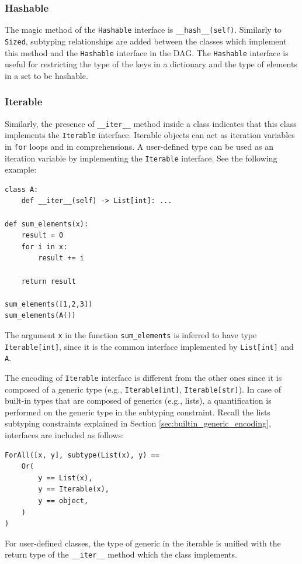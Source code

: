 \subsubsection{Hashable}
The magic method of the \lstinline|Hashable| interface is \lstinline|__hash__(self)|. Similarly to \lstinline|Sized|, subtyping relationships are added between the classes which implement this method and the \lstinline|Hashable| interface in the DAG. The \lstinline|Hashable| interface is useful for restricting the type of the keys in a dictionary and the type of elements in a set to be hashable.

\subsubsection{Iterable}
Similarly, the presence of \lstinline|__iter__| method inside a class indicates that this class implements the \lstinline|Iterable| interface. Iterable objects can act as iteration variables in \lstinline|for| loops and in comprehensions. A user-defined type can be used as an iteration variable by implementing the \lstinline|Iterable| interface. See the following example:
\begin{lstlisting}
class A:
	def __iter__(self) -> List[int]: ...

def sum_elements(x):
	result = 0
	for i in x:
		result += i
	
	return result
	
sum_elements([1,2,3])
sum_elements(A())
\end{lstlisting}
The argument \lstinline|x| in the function \lstinline|sum_elements| is inferred to have type \lstinline|Iterable[int]|, since it is the common interface implemented by \lstinline|List[int]| and \lstinline|A|.

The encoding of \lstinline|Iterable| interface is different from the other ones since it is composed of a generic type (e.g., \lstinline|Iterable[int]|, \lstinline|Iterable[str]|). In case of built-in types that are composed of generics (e.g., lists), a quantification is performed on the generic type in the subtyping constraint. Recall the lists subtyping constraints explained in Section \ref{sec:builtin_generic_encoding}, interfaces are included as follows:
\begin{lstlisting}
ForAll([x, y], subtype(List(x), y) ==
	Or(
		y == List(x),
		y == Iterable(x),
		y == object,
	)
)
\end{lstlisting}
For user-defined classes, the type of generic in the iterable is unified with the return type of the \lstinline|__iter__| method which the class implements.
